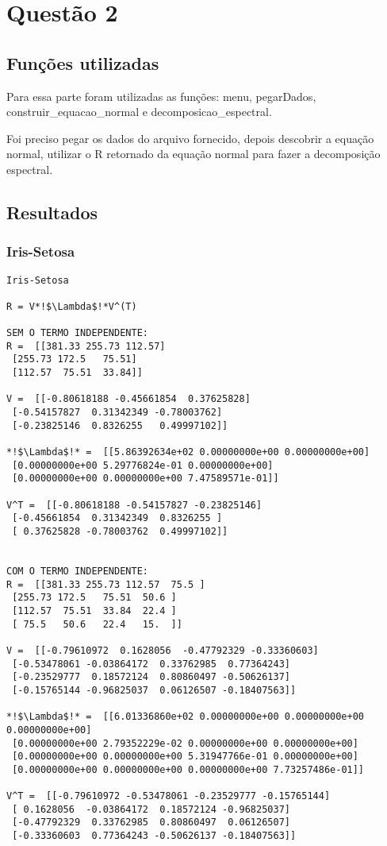 \documentclass[a4paper,12pt,twoside]{article}
\begin{document}
\section{Questão 2}
\subsection{Funções utilizadas}
Para essa parte foram utilizadas as funções: menu, pegarDados, construir\_equacao\_normal e decomposicao\_espectral.

Foi preciso pegar os dados do arquivo fornecido, depois descobrir a equação normal, utilizar o R retornado da equação normal para fazer a decomposição espectral.
\subsection{Resultados}
\subsubsection {Iris-Setosa}


\begin{lstlisting}
Iris-Setosa

R = V*!$\Lambda$!*V^(T)

SEM O TERMO INDEPENDENTE: 
R =  [[381.33 255.73 112.57]
 [255.73 172.5   75.51]
 [112.57  75.51  33.84]]

V =  [[-0.80618188 -0.45661854  0.37625828]
 [-0.54157827  0.31342349 -0.78003762]
 [-0.23825146  0.8326255   0.49997102]]

*!$\Lambda$!* =  [[5.86392634e+02 0.00000000e+00 0.00000000e+00]
 [0.00000000e+00 5.29776824e-01 0.00000000e+00]
 [0.00000000e+00 0.00000000e+00 7.47589571e-01]]

V^T =  [[-0.80618188 -0.54157827 -0.23825146]
 [-0.45661854  0.31342349  0.8326255 ]
 [ 0.37625828 -0.78003762  0.49997102]]


COM O TERMO INDEPENDENTE: 
R =  [[381.33 255.73 112.57  75.5 ]
 [255.73 172.5   75.51  50.6 ]
 [112.57  75.51  33.84  22.4 ]
 [ 75.5   50.6   22.4   15.  ]]

V =  [[-0.79610972  0.1628056  -0.47792329 -0.33360603]
 [-0.53478061 -0.03864172  0.33762985  0.77364243]
 [-0.23529777  0.18572124  0.80860497 -0.50626137]
 [-0.15765144 -0.96825037  0.06126507 -0.18407563]]

*!$\Lambda$!* =  [[6.01336860e+02 0.00000000e+00 0.00000000e+00 0.00000000e+00]
 [0.00000000e+00 2.79352229e-02 0.00000000e+00 0.00000000e+00]
 [0.00000000e+00 0.00000000e+00 5.31947766e-01 0.00000000e+00]
 [0.00000000e+00 0.00000000e+00 0.00000000e+00 7.73257486e-01]]

V^T =  [[-0.79610972 -0.53478061 -0.23529777 -0.15765144]
 [ 0.1628056  -0.03864172  0.18572124 -0.96825037]
 [-0.47792329  0.33762985  0.80860497  0.06126507]
 [-0.33360603  0.77364243 -0.50626137 -0.18407563]]

\end{lstlisting}
\end{document}
